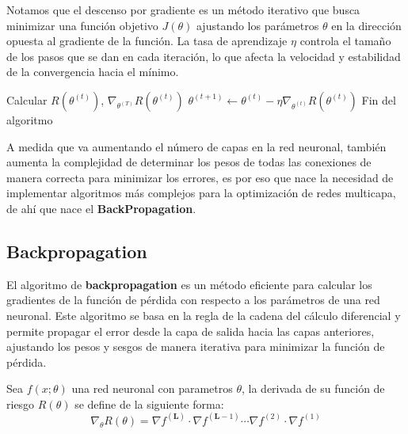 Notamos que el descenso por gradiente es un método iterativo que busca minimizar una función objetivo $J(\theta)$ ajustando los parámetros $\theta$ en la dirección opuesta al gradiente de la función. La tasa de aprendizaje $\eta$ controla el tamaño de los pasos que se dan en cada iteración, lo que afecta la velocidad y estabilidad de la convergencia hacia el mínimo.

\begin{algorithm}[H]
    \caption{Algoritmo de actualización GD}\label{alg:cap}
    \begin{algorithmic}
        \State Calcular $R(\theta ^{(t)})$, $\nabla_{\theta^{(T)}}R(\theta ^{(t)})$
        \State $\theta ^{(t+1)} \gets \theta^{(t)} - \eta \nabla_{\theta^{(t)}}R(\theta ^{(t)})$
        \Else
        \State Fin del algoritmo
        \EndIf
        \EndFor
    \end{algorithmic}
\end{algorithm}
\noindent

A medida que va aumentando el número de capas en la red neuronal, también aumenta la complejidad de determinar los pesos de todas las conexiones de manera correcta para minimizar los errores, es por eso que nace la necesidad de implementar algoritmos más complejos para la optimización de redes multicapa, de ahí que nace el \textbf{BackPropagation}.

\subsection{Backpropagation}
El algoritmo de \textbf{backpropagation} es un método eficiente para calcular los gradientes de la función de pérdida con respecto a los parámetros de una red neuronal. Este algoritmo se basa en la regla de la cadena del cálculo diferencial y permite propagar el error desde la capa de salida hacia las capas anteriores, ajustando los pesos y sesgos de manera iterativa para minimizar la función de pérdida.


\begin{definition}
    Sea $f(x;\theta)$ una red neuronal con parametros $\theta$, la derivada de su función de riesgo $R(\theta)$ se define de la siguiente forma:
    \[
        \nabla_\theta R(\theta) = \nabla f^{(\mathbf{L})} \cdot \nabla f^{(\mathbf{L}-1)} \cdots \nabla f^{(2)} \cdot \nabla f^{(1)}
    \]
\end{definition}

